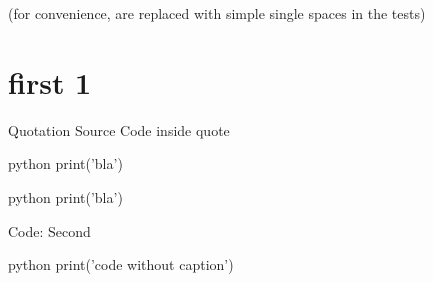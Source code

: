 (for convenience,   are replaced with simple single spaces in the tests)

\chapter{first 1}
\begin{Quotation}{Quotation Source}
Code inside quote

\begin{codeBlock}{python}
print('bla')
\end{codeBlock}
\end{Quotation}

\begin{codeBlock}[First]{python}
print('bla')
\end{codeBlock}

Code: Second

\begin{codeBlock}{python}
print('code without caption')
\end{codeBlock}
